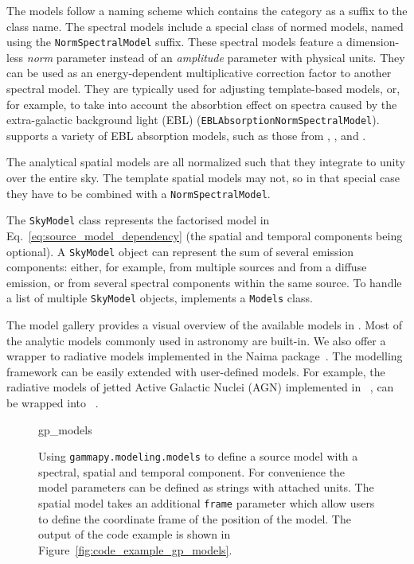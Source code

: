 \documentclass[longauth]{aa}
\newcommand{\code}[1]{\texttt{#1}}
\begin{document}
The models follow a naming scheme which contains the category as a suffix to
the class name. The spectral models include a special class of normed models,
named using the \code{NormSpectralModel} suffix.
These spectral models feature a dimension-less \textit{norm} parameter
instead of an \textit{amplitude} parameter with physical units. They
can be used as an energy-dependent multiplicative correction
factor to another spectral model. They are typically used for
adjusting template-based models, or, for example, to take into account
the absorbtion effect on \gammaray spectra caused by the extra-galactic background
light (EBL) (\code{EBLAbsorptionNormSpectralModel}). \gammapy supports a variety
of EBL absorption models, such as those from \cite{Franceschini2008, Franceschini2017}, \cite{Finke2010},
and \cite{Dominguez2011}.

The analytical spatial models are all normalized such that they integrate to
unity over the entire sky. The template spatial models may not, so in that special
case they have to be combined with a \code{NormSpectralModel}.

The \code{SkyModel} class represents the factorised model in Eq.~\ref{eq:source_model_dependency}
(the spatial and temporal components being optional).
A \code{SkyModel} object can represent the sum of several emission components:
either, for example, from multiple sources and from a diffuse emission, or from several spectral
components within the same source. To handle a list of multiple \code{SkyModel} objects, \gammapy
implements a \code{Models} class.

The model gallery provides a visual overview of the available models in
\gammapy. Most of the analytic models commonly used in \gammaray astronomy are
built-in. We also offer a wrapper to radiative models implemented in the Naima
package~\citep{naima}. The modelling framework can be easily extended with
user-defined models. For example, the radiative models of jetted Active Galactic Nuclei (AGN)
implemented in \agnpy~\citep{agnpy2022}, can be wrapped into 
\gammapy~\citep[see Section 3.5 of ][]{2022A&A...660A..18N}.

\begin{figure}
	\small
	{gp_models}
	\caption{Using \code{gammapy.modeling.models} to define a source model with a
    spectral, spatial and temporal component. For convenience the model
    parameters can be defined as strings with attached units. The spatial model
    takes an additional \code{frame} parameter which allow users to define
    the coordinate frame of the position of the model. The output
	of the code example is shown in Figure~\ref{fig:code_example_gp_models}.
    }
	\label{fig*:minted:gp_models}
\end{figure}
\end{document}
